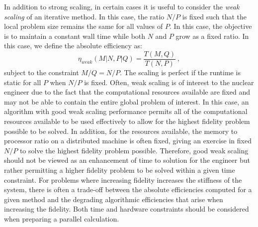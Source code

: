 In addition to strong scaling, in certain cases it is useful to
consider the \textit{weak scaling} of an iterative method. In this
case, the ratio $N/P$ is fixed such that the local problem size
remains the same for all values of $P$. In this case, the objective is
to maintain a constant wall time while both $N$ and $P$ grow as a
fixed ratio. In this case, we define the absolute efficiency as:
\begin{equation}
  \eta_{weak}(M|N,P|Q) = \frac{T(M,Q)}{T(N,P)}\:,
  \label{eq:weak_scaling_absolute}
\end{equation}
subject to the constraint $M/Q = N/P$. The scaling is perfect if the
runtime is static for all $P$ when $N/P$ is fixed. Often, weak scaling
is of interest to the nuclear engineer due to the fact that the
computational resources available are fixed and may not be able to
contain the entire global problem of interest. In this case, an
algorithm with good weak scaling performance permits all of the
computational resources available to be used effectively to allow for
the highest fidelity problem possible to be solved. In addition, for
the resources available, the memory to processor ratio on a
distributed machine is often fixed, giving an exercise in fixed $N/P$
to solve the highest fidelity problem possible. Therefore, good weak
scaling should not be viewed as an enhancement of time to solution for
the engineer but rather permitting a higher fidelity problem to be
solved within a given time constraint. For problems where increasing
fidelity increases the stiffness of the system, there is often a
trade-off between the absolute efficiencies computed for a given
method and the degrading algorithmic efficiencies that arise when
increasing the fidelity. Both time and hardware constraints should be
considered when preparing a parallel calculation.

\clearpage

